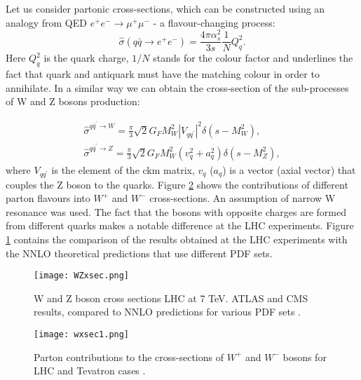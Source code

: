 		Let us consider partonic cross-sections, which can be constructed using an analogy from QED $e^{+}e^{-}\rightarrow \mu^{+}\mu^{-}$ - a flavour-changing process:
		\begin{equation}
			\hat{\sigma}(q\bar q \rightarrow e^{+}e^{-}) = \frac{4\pi \alpha_s^2}{3s}\frac{1}{N}Q^2_q.
		\end{equation}	
		Here $Q^2_q$ is the quark charge, $1/N$ stands for the colour factor and underlines the fact that quark and antiquark must have the matching colour in order to annihilate. In a similar way we can obtain the cross-section of the sub-processes of W and Z bosons production:

		\begin{equation}
		\begin{array}{lcl} 
		\hat{\sigma}^{q\bar q^\prime \rightarrow W}= \frac{\pi }{3}\sqrt{2}G_FM^2_W|V_{qq^\prime}|^2\delta(s-M^2_W),\\
		\hat{\sigma}^{q\bar q^\prime \rightarrow Z}= \frac{\pi }{3}\sqrt{2}G_FM^2_W(v^2_q+a^2_q)\delta(s-M^2_Z),
		\end{array}
		\end{equation}	
		where $V_{qq^\prime}$ is the element of the \gls{ckm} matrix,  $v_q$ ($a_q$) is a vector (axial vector) that couples the Z boson to the quarks. Figure \ref{fig::wxsec} shows the contributions of different parton flavours into $W^+$ and $W^-$ cross-sections. An assumption of narrow W resonance was used. The fact that the bosons with opposite charges are formed from different quarks makes a notable difference at the LHC experiments. Figure \ref{fig::wzxsec} contains the comparison of the results obtained at the LHC experiments with the NNLO theoretical predictions that use different PDF sets.
		\begin{figure}[htbp]
		\texttt{[image: WZxsec.png]}
		\caption{W and Z boson cross sections LHC at 7 TeV. ATLAS and CMS results, compared to NNLO predictions for various PDF sets \cite{Mangano:2015ejw}.}
		\label{fig::wzxsec}
		\end{figure}
			\begin{figure}[htbp]
		\centering
		\texttt{[image: wxsec1.png]}
		\caption{Parton contributions to the cross-sections of $W^+$ and $W^-$ bosons for LHC and Tevatron cases \cite{Martin:392675}.}
		\label{fig::wxsec}
		\end{figure}
	
